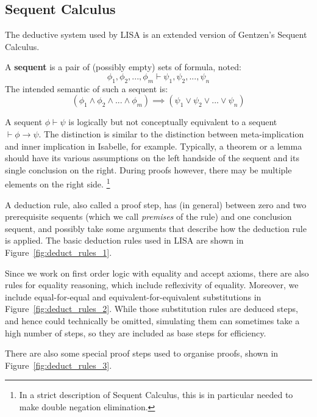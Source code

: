 \subsection{Sequent Calculus}
\label{subs:lk}
The deductive system used by LISA is an extended version of Gentzen's Sequent Calculus.
\begin{defin}
A \textbf{sequent} is a pair of (possibly empty) sets of formula, noted:
$$\phi_1, \phi_2, ..., \phi_m \vdash \psi_1, \psi_2, ..., \psi_n$$
The intended semantic of such a sequent is:
\begin{equation}
\label{eq:SequentSemantic}
(\phi_1 \land \phi_2 \land ... \land \phi_m ) \implies (\psi_1 \lor \psi_2 \lor ... \lor \psi_n )
\end{equation}

\end{defin}
A sequent $\phi \vdash \psi$ is logically but not conceptually equivalent to a sequent $\vdash \phi \rightarrow \psi$. The distinction is similar to the distinction between meta-implication and inner implication in Isabelle, for example. Typically, a theorem or a lemma should have its various assumptions on the left handside of the sequent and its single conclusion on the right. During proofs however, there may be multiple elements on the right side. \footnote{In a strict description of Sequent Calculus, this is in particular needed to make double negation elimination.}

A deduction rule, also called a proof step, has  (in general) between zero and two prerequisite sequents (which we call \textit{premises} of the rule) and one conclusion sequent, and possibly take some arguments that describe how the deduction rule is applied. The basic deduction rules used in LISA are shown in Figure~\ref{fig:deduct_rules_1}.

Since we work on first order logic with equality and accept axioms, there are also rules for equality reasoning, which include reflexivity of equality. Moreover, we include equal-for-equal and equivalent-for-equivalent substitutions in Figure~\ref{fig:deduct_rules_2}. While those substitution rules are deduced steps, and hence could technically be omitted, simulating them can sometimes take a high number of steps, so they are included as base steps for efficiency. 

There are also some special proof steps used to organise proofs, shown in Figure~\ref{fig:deduct_rules_3}.

